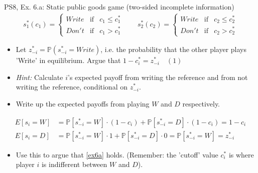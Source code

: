 \begin{frame}{PS8, Ex. 6.a: Static public goods game (two-sided incomplete information)}
    \begin{align*}
      s_1^*(c_1)=\left\{\begin{array}{rcl}
        Write & \text{if} & c_1\leq c_1^*\\
        Don't & \text{if} & c_1>c_1^*
        \end{array}\right.\quad\quad
      s_2^*(c_2)=\left\{\begin{array}{rcl}
        Write & \text{if} & c_2\leq c_2^*\\
        Don't & \text{if} & c_2>c_2^*
        \end{array}\right.
    \end{align*}
    \vspace{-12pt}
    \begin{itemize}
      \item[(a)] Let $z_{-i}^* = \mathbb{P}(s_{-i}^*=Write)$, i.e. the probability that the other player plays 'Write' in equilibrium. Argue that $1-c_i^*=z_{-i}^*\quad(1)$
      \item[] \textit{Hint:} Calculate $i$'s expected payoff from writing the reference and from not writing the reference, conditional on $z_{-i}^*$.
    \end{itemize}
    \vspace{-8pt}
    \begin{itemize}
      \item[Step 1:] Write up the expected payoffs from playing $W$ and $D$ respectively.
    \end{itemize}
    \vspace{-8pt}
    \begin{align*}
      E[s_i=W]&=\mathbb{P}\left[s_{-i}^*=W\right]\cdot(1-c_i)+\mathbb{P}\left[s_{-i}^*=D\right]\cdot(1-c_i)=1-c_i\\
      E[s_i=D]&=\mathbb{P}\left[s_{-i}^*=W\right]\cdot1+\mathbb{P}\left[s_{-i}^*=D\right]\cdot0=\mathbb{P}\left[s_{-i}^*=W\right]=z_{-i}^*
    \end{align*}
    \vspace{-16pt}
    \begin{itemize}
      \item[Step 2:] Use this to argue that \eqref{ex6a} holds. (Remember: the 'cutoff' value $c_i^*$ is where player $i$ is indifferent between $W$ and $D$).
    \end{itemize}
    \vfill\null
\end{frame}
